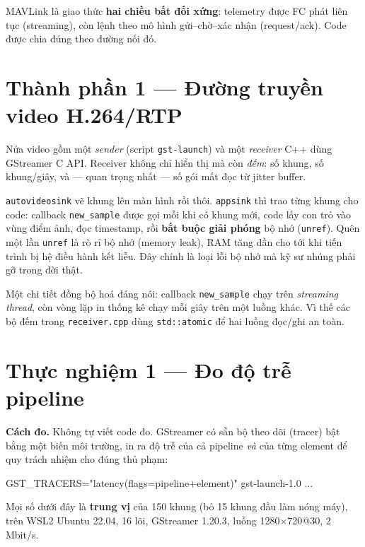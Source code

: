 \documentclass[12pt]{ai_conquer2026}
\begin{document}
MAVLink là giao thức \textbf{hai chiều bất đối xứng}: telemetry được FC phát liên
tục (streaming), còn lệnh theo mô hình gửi--chờ--xác nhận (request/ack). Code
được chia đúng theo đường nối đó.

\section{Thành phần 1 --- Đường truyền video H.264/RTP}

Nửa video gồm một \emph{sender} (script \texttt{gst-launch}) và một \emph{receiver}
C++ dùng GStreamer C API. Receiver không chỉ hiển thị mà còn \emph{đếm}: số khung,
số khung/giây, và --- quan trọng nhất --- số gói mất đọc từ jitter buffer.

\begin{aivncodebox}
\texttt{autovideosink} vẽ khung lên màn hình rồi thôi. \texttt{appsink} thì trao
từng khung cho code: callback \texttt{new\_sample} được gọi mỗi khi có khung mới,
code lấy con trỏ vào vùng điểm ảnh, đọc timestamp, rồi \textbf{bắt buộc giải
phóng} bộ nhớ (\texttt{unref}). Quên một lần \texttt{unref} là rò rỉ bộ nhớ
(memory leak), RAM tăng dần cho tới khi tiến trình bị hệ điều hành kết liễu. Đây
chính là loại lỗi bộ nhớ mà kỹ sư nhúng phải gỡ trong đời thật.
\end{aivncodebox}

Một chi tiết đồng bộ hoá đáng nói: callback \texttt{new\_sample} chạy trên
\emph{streaming thread}, còn vòng lặp in thống kê chạy mỗi giây trên một luồng
khác. Vì thế các bộ đếm trong \texttt{receiver.cpp} dùng \texttt{std::atomic} để
hai luồng đọc/ghi an toàn.

\section{Thực nghiệm 1 --- Đo độ trễ pipeline}
\label{sec:latency}

\textbf{Cách đo.} Không tự viết code đo. GStreamer có sẵn bộ theo dõi (tracer)
bật bằng một biến môi trường, in ra độ trễ của cả pipeline \emph{và} của từng
element để quy trách nhiệm cho đúng thủ phạm:

\begin{aivnoutputbox}
GST_TRACERS="latency(flags=pipeline+element)" gst-launch-1.0 ...
\end{aivnoutputbox}

Mọi số dưới đây là \textbf{trung vị} của 150 khung (bỏ 15 khung đầu làm nóng
máy), trên WSL2 Ubuntu 22.04, 16 lõi, GStreamer 1.20.3, luồng
1280$\times$720@30, 2 Mbit/s.
\end{document}

